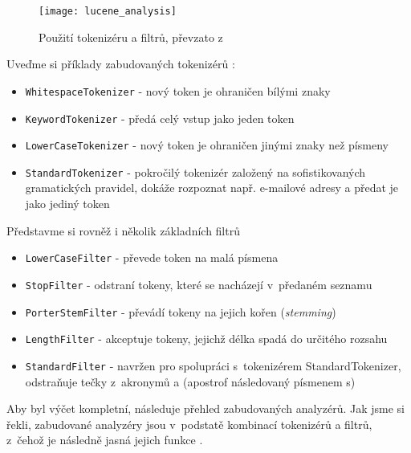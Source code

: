 \documentclass[11pt,oneside]{fithesis2}
\begin{document}
\begin{figure}[htp]
	\begin{center}
		\texttt{[image: lucene\_analysis]}
	\end{center}
	\caption{Použití tokenizéru a filtrů, převzato z~ \cite[s.~117]{LuceneAction}}	
	\label{AnalysisLucene}
\end{figure}

Uveďme si příklady zabudovaných tokenizérů  \cite[s.~118]{LuceneAction}:

\begin{itemize}
	\item \texttt{WhitespaceTokenizer} - nový token je ohraničen bílými znaky
	\item \texttt{KeywordTokenizer} - předá celý vstup jako jeden token
	\item \texttt{LowerCaseTokenizer} - nový token je ohraničen jinými znaky než písmeny
	\item \texttt{StandardTokenizer} - pokročilý tokenizér založený na sofistikovaných gramatických pravidel, dokáže rozpoznat např. e-mailové adresy a předat je jako jediný token
\end{itemize}

Představme si rovněž i několik základních filtrů  \cite[s.~118]{LuceneAction}
\begin{itemize}
	\item \texttt{LowerCaseFilter} - převede token na malá písmena
	\item \texttt{StopFilter} - odstraní tokeny, které se nacházejí v~předaném seznamu
	\item \texttt{PorterStemFilter} - převádí tokeny na jejich kořen (\emph{stemming})
	\item \texttt{LengthFilter} - akceptuje tokeny, jejichž délka spadá do určitého rozsahu
	\item \texttt{StandardFilter} - navržen pro spolupráci s~tokenizérem StandardTokenizer, odstraňuje tečky z~akronymů a  (apostrof následovaný písmenem s)
\end{itemize}

Aby byl výčet kompletní, následuje přehled zabudovaných analyzérů. Jak jsme si řekli, zabudované analyzéry jsou v~podstatě kombinací tokenizérů a filtrů, z~čehož je následně jasná jejich funkce  \cite[s.~112]{LuceneAction}.
\end{document}
